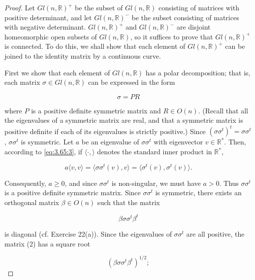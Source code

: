 \begin{proof}
Let $Gl(n,\mathbb{R})^{+}$ be the subset of $Gl(n,\mathbb{R})$ consisting of matrices with positive determinant, and let $Gl(n,\mathbb{R})^{-}$ be the subset consisting of matrices with negative determinant. $Gl(n,\mathbb{R})^{+}$ and $Gl(n,\mathbb{R})^{-}$ are disjoint homeomorphic open subsets of $Gl(n,\mathbb{R})$, so it suffices to prove that $Gl(n,\mathbb{R})^{+}$ is connected. To do this, we shall show that each element of $Gl(n,\mathbb{R})^{+}$ can be joined to the identity matrix by a continuous curve.

First we show that each element of $Gl(n, \mathbb{R})$ has a polar decomposition; that is, each matrix $\sigma \in Gl(n, \mathbb{R})$ can be expressed in the form

\begin{equation}
\tag{1}\label{eq:3.68:1}
\sigma=P R
\end{equation}

where $P$ is a positive definite symmetric matrix and $R \in O(n)$. (Recall that all the eigenvalues of a symmetric matrix are real, and that a symmetric matrix is positive definite if each of its eigenvalues is strictly positive.) Since $(\sigma\sigma^t)^t = \sigma\sigma^t$, $\sigma\sigma^t$ is symmetric. Let $a$ be an eigenvalue of $\sigma\sigma^t$ with eigenvector $v \in \mathbb{R}^*$. Then, according to \eqref{eq:3.65:3}, if $\langle \cdot, \rangle$ denotes the standard inner product in $\mathbb{R}^*$,

\[
a\langle v,v\rangle=\langle\sigma\sigma^{t}(v),v\rangle=\langle\sigma^{t}(v),\sigma^{t}(v)\rangle.
\]

Consequently, $a \geq 0$, and since $\sigma\sigma^t$ is non-singular, we must have $a > 0$. Thus $\sigma\sigma^t$ is a positive definite symmetric matrix. Since $\sigma\sigma^t$ is symmetric, there exists an orthogonal matrix $\beta \in O(n)$ such that the matrix

\begin{equation}
\tag{2}\label{eq:3.68:2}
\beta\sigma\sigma^{t}\beta^{t}
\end{equation}

is diagonal (cf. Exercise 22(a)). Since the eigenvalues of $\sigma\sigma^{t}$ are all positive, the matrix (2) has a square root

\begin{equation}
\tag{3}\label{eq:3.68:3}
(\beta\sigma\sigma^{t}\beta^{t})^{1/2};
\end{equation}


\end{proof}
